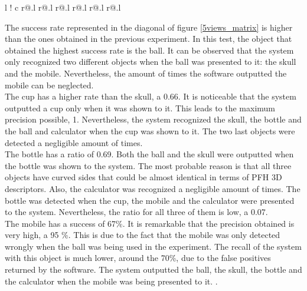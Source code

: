\begin{table}[H]
\begin{tabular} {l !{\vrule width .08em} c r@{.}l r@{.}l r@{.}l r@{.}l r@{.}l r@{.}l }
\\

\end{tabular}
\caption[Confusion matrix - templates using 5 views]{Confusion matrix using a template that stores five views per object. The results are given in a 0 to 1 range. }
\label{5views_matrix}
\end{table}

	The success rate represented in the diagonal of figure \ref{5views_matrix} is higher than the ones obtained in the previous experiment. 
	In this test, the object that obtained the highest success rate is the ball. 
	It can be observed that the system only recognized two different objects when the ball was presented to it: the skull and the mobile. 
	Nevertheless, the amount of times the software outputted the mobile can be neglected. 
	\\

	The cup has a higher rate than the skull, a 0.66. 
	It is noticeable that the system outputted a cup only when it was shown to it. 
	This leads to the maximum precision possible, 1. %
	Nevertheless, the system recognized the skull, the bottle and the ball and calculator when the cup was shown to it. 
	The two last objects were detected a negligible amount of times. \\

	The bottle has a ratio of 0.69. 
	Both the ball and the skull were outputted when the bottle was shown to the system. 
	The most probable reason is that all three objects have curved sides that could be almost identical in terms of PFH 3D descriptors. 
	Also, the calculator was recognized a negligible amount of times. 
	The bottle was detected when the cup, the mobile and the calculator were presented to the system. 
	Nevertheless, the ratio for all three of them is low, a 0.07. 
	\\

	The mobile has a success of 67\%. 
	It is remarkable that the precision obtained is very high, a 95 \%. 
	This is due to the fact that the mobile was only detected wrongly when the ball was being used in the experiment. 
	The recall of the system with this object is much lower, around the 70\%, due to the false positives returned by the software. 
	The system outputted the ball, the skull, the bottle and the calculator when the mobile was being presented to it. . 
	\\

